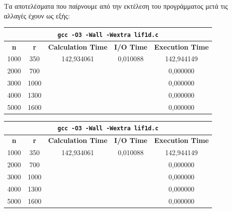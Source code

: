 \documentclass[a4paper,oneside,titlepage,10pt]{article}
\begin{document}
\noindent Τα αποτελέσματα που παίρνουμε από την εκτέλεση του προγράμματος μετά τις αλλαγές έχουν ως εξής:

\begin{table}[!h]
	\centering
	\begin{tabular}{|c|c|c|c|c|}
		\hline
		\multicolumn{5}{|c|}{\cellcolor[HTML]{EFEFEF}\texttt{\textbf{gcc -O3 -Wall -Wextra lif1d.c}}}                       \\ \hline
		\textbf{n} & \textbf{r} & \textbf{Calculation Time} & \textbf{I/O Time} & \textbf{Execution Time} \\ \hline
		1000       & 350        & 142,934061                & 0,010088          & 142,944149              \\ \hline
		2000       & 700        &                           &                   & 0,000000                \\ \hline
		3000       & 1000       &                           &                   & 0,000000                \\ \hline
		4000       & 1300       &                           &                   & 0,000000                \\ \hline
		5000       & 1600       &                           &                   & 0,000000                \\ \hline
	\end{tabular}
\end{table}

\begin{table}[!h]
	\centering
	\begin{tabular}{|c|c|c|c|c|}
		\hline
		\multicolumn{5}{|c|}{\texttt{\textbf{gcc -O3 -Wall -Wextra lif1d.c}}}                                              \\ \hline
		\textbf{n} & \textbf{r} & \textbf{Calculation Time} & \textbf{I/O Time} & \textbf{Execution Time} \\ \hline
		1000       & 350        & 142,934061                & 0,010088          & 142,944149              \\ \hline
		2000       & 700        &                           &                   & 0,000000                \\ \hline
		3000       & 1000       &                           &                   & 0,000000                \\ \hline
		4000       & 1300       &                           &                   & 0,000000                \\ \hline
		5000       & 1600       &                           &                   & 0,000000                \\ \hline
	\end{tabular}
\end{table}
\end{document}
